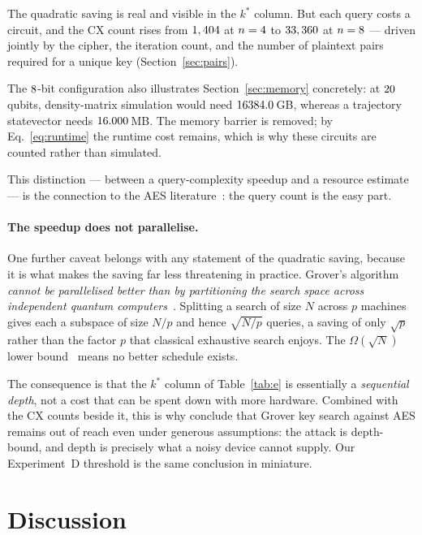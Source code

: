 \documentclass[11pt,a4paper]{article}
\begin{document}
The quadratic saving is real and visible in the $k^\ast$ column. But each query
costs a circuit, and the CX count rises from $1,404$ at $n=4$ to
$33,360$ at $n=8$ --- driven jointly by the cipher, the iteration
count, and the number of plaintext pairs required for a unique key
(Section~\ref{sec:pairs}).

The $8$-bit configuration also illustrates
Section~\ref{sec:memory} concretely: at $20$ qubits, density-matrix
simulation would need $16384.0$\,GB, whereas a trajectory statevector
needs $16.000$\,MB. The memory barrier is removed; by
Eq.~\eqref{eq:runtime} the runtime cost remains, which is why these circuits are
counted rather than simulated.

This distinction --- between a query-complexity speedup and a resource estimate
--- is the connection to the AES literature~\citep{grassl2016,jaques2020}: the
query count is the easy part.

\paragraph{The speedup does not parallelise.} One further caveat belongs with any
statement of the quadratic saving, because it is what makes the saving far less
threatening in practice. Grover's algorithm \emph{cannot be parallelised better
than by partitioning the search space across independent quantum
computers}~\citep{zalka1999}. Splitting a search of size $N$ across $p$ machines
gives each a subspace of size $N/p$ and hence $\sqrt{N/p}$ queries, a saving of
only $\sqrt{p}$ rather than the factor $p$ that classical exhaustive search
enjoys. The $\Omega(\sqrt{N})$ lower bound~\citep{bennett1997,zalka1999} means no
better schedule exists.

The consequence is that the $k^\ast$ column of Table~\ref{tab:e} is essentially
a \emph{sequential depth}, not a cost that can be spent down with more hardware.
Combined with the CX counts beside it, this is why \citet{jaques2020} conclude
that Grover key search against AES remains out of reach even under generous
assumptions: the attack is depth-bound, and depth is precisely what a noisy
device cannot supply. Our Experiment~D threshold is the same conclusion in
miniature.

\section{Discussion}
\end{document}
